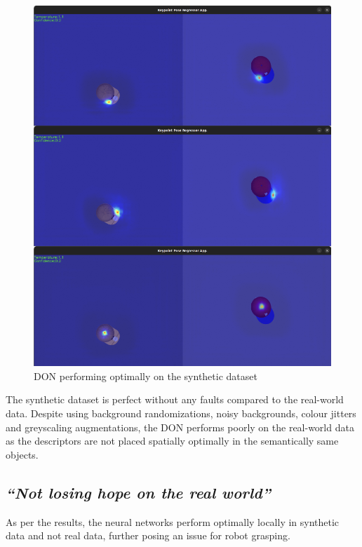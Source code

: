 \begin{figure}[htb]
    \centering
    \caption{\ac{DON} performing optimally on the synthetic dataset}
    \label{fig:don_performing_optimally}
    \includegraphics[scale=0.25]{images/cap/heatmaps_dataset.png}
\end{figure}

The synthetic dataset is perfect without any faults compared to the real-world data. Despite using background randomizations, noisy backgrounds, colour jitters and greyscaling augmentations, the \ac{DON} performs poorly on the real-world data as the
descriptors are not placed spatially optimally in the semantically same objects.

\subsection{\emph{``Not losing hope on the real world''}}

As per the results, the neural networks perform optimally locally in synthetic data and not real data, further posing an issue for robot grasping.\\

